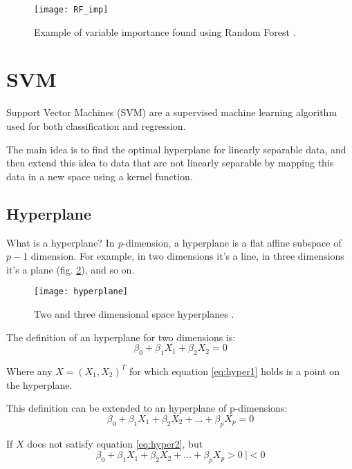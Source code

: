 \begin{figure}[H]
	\centering
	\texttt{[image: RF\_imp]}
	\caption{Example of variable importance found using Random Forest \cite{rf_imp}.}
	\label{fig:RF_imp}
\end{figure}

\clearpage

\section{SVM} \label{svm}
Support Vector Machines (SVM) are a supervised machine learning algorithm used for both classification and regression.

The main idea is to find the optimal hyperplane for linearly separable data, and then extend this idea to data that are not linearly separable by mapping this data in a new space using a kernel function.

\subsection{Hyperplane}
What is a hyperplane? In \textit{p}-dimension, a hyperplane is a flat affine subspace of $p - 1$ dimension. For example, in two dimensions it's a line, in three dimensions it's a plane (fig. \ref{fig:hyperplane}), and so on.

\begin{figure}[H]
	\centering
	\texttt{[image: hyperplane]}
	\caption{Two and three dimensional space hyperplanes \cite{hyperplaneimg}.}
	\label{fig:hyperplane}
\end{figure}

The definition of an hyperplane for two dimensions is:
\begin{equation} \label{eq:hyper1}
\beta_0 + \beta_1 X_1 + \beta_2 X_2 = 0
\end{equation}

Where any $X = (X_1, X_2)^T$ for which equation \ref{eq:hyper1} holds is a point on the hyperplane.

This definition can be extended to an hyperplane of p-dimensions:
\begin{equation} \label{eq:hyper2}
\beta_0 + \beta_1 X_1 + \beta_2 X_2 + \dots + \beta_p X_p = 0
\end{equation}

If $X$ does not satisfy equation \ref{eq:hyper2}, but
\begin{equation} \label{eq:hyper3}
\beta_0 + \beta_1 X_1 + \beta_2 X_2 + \dots + \beta_p X_p > 0 \ | < 0
\end{equation}

